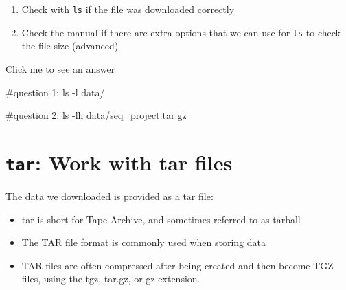 \documentclass[
  letterpaper,
  DIV=11,
  numbers=noendperiod]{scrreprt}
\newenvironment{Shaded}{}{}
\newcommand{\AttributeTok}[1]{\textcolor[rgb]{0.84,0.23,0.29}{#1}}
\newcommand{\CommentTok}[1]{\textcolor[rgb]{0.42,0.45,0.49}{#1}}
\newcommand{\FunctionTok}[1]{\textcolor[rgb]{0.44,0.26,0.76}{#1}}
\newcommand{\NormalTok}[1]{\textcolor[rgb]{0.14,0.16,0.18}{#1}}
\providecommand{\tightlist}{%
  \setlength{\itemsep}{0pt}\setlength{\parskip}{0pt}}\usepackage{longtable,booktabs,array}
\begin{document}
\begin{tcolorbox}[enhanced jigsaw, rightrule=.15mm, colbacktitle=quarto-callout-caution-color!10!white, colframe=quarto-callout-caution-color-frame, colback=white, arc=.35mm, opacitybacktitle=0.6, coltitle=black, bottomtitle=1mm, breakable, bottomrule=.15mm, leftrule=.75mm, titlerule=0mm, title=\textcolor{quarto-callout-caution-color}{\faFire}\hspace{0.5em}{Exercise}, toprule=.15mm, toptitle=1mm, opacityback=0, left=2mm]

\begin{enumerate}
\def\labelenumi{\arabic{enumi}.}
\tightlist
\item
  Check with \texttt{ls} if the file was downloaded correctly
\item
  Check the manual if there are extra options that we can use for
  \texttt{ls} to check the file size (advanced)
\end{enumerate}

Click me to see an answer

\begin{Shaded}
\begin{Highlighting}[]
\CommentTok{\#question 1:}
\FunctionTok{ls} \AttributeTok{{-}l}\NormalTok{ data/}

\CommentTok{\#question 2:}
\FunctionTok{ls} \AttributeTok{{-}lh}\NormalTok{ data/seq\_project.tar.gz}
\end{Highlighting}
\end{Shaded}

\end{tcolorbox}

\section{\texorpdfstring{\texttt{tar}: Work with tar
files}{tar: Work with tar files}}\label{tar-work-with-tar-files}

The data we downloaded is provided as a tar file:

\begin{itemize}
\tightlist
\item
  tar is short for Tape Archive, and sometimes referred to as tarball
\item
  The TAR file format is commonly used when storing data
\item
  TAR files are often compressed after being created and then become TGZ
  files, using the tgz, tar.gz, or gz extension.
\end{itemize}
\end{document}
